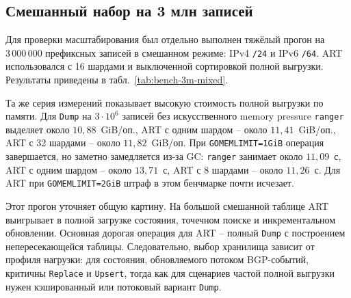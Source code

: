 \subsection{Смешанный набор на 3 млн записей}

Для проверки масштабирования был отдельно выполнен тяжёлый прогон на
$3\,000\,000$ префиксных записей в смешанном режиме: IPv4 \texttt{/24} и
IPv6 \texttt{/64}. ART использовался с 16 шардами и выключенной
сортировкой полной выгрузки. Результаты приведены в
табл.~\ref{tab:bench-3m-mixed}.

\begin{table}[ht]
\centering
\caption{Сравнение \texttt{ranger} и шардированного ART на смешанном наборе из $3\cdot10^6$ записей}
\label{tab:bench-3m-mixed}
\small
{}
\end{table}

Та же серия измерений показывает высокую стоимость полной выгрузки по
памяти. Для \texttt{Dump} на $3\cdot10^6$ записей без искусственного
memory pressure \texttt{ranger} выделяет около $10{,}88$~GiB/оп.,
ART с одним шардом -- около $11{,}41$~GiB/оп., ART с 32 шардами --
около $11{,}82$~GiB/оп. При \texttt{GOMEMLIMIT=1GiB} операция
завершается, но заметно замедляется из-за GC: \texttt{ranger} занимает
около $11{,}09$~с, ART с одним шардом -- около $13{,}71$~с, ART с
8 шардами -- около $11{,}26$~с. Для ART при \texttt{GOMEMLIMIT=2GiB}
штраф в этом бенчмарке почти исчезает.

Этот прогон уточняет общую картину. На большой смешанной таблице ART
выигрывает в полной загрузке состояния, точечном поиске и
инкрементальном обновлении. Основная дорогая операция для ART --
полный \texttt{Dump} с построением непересекающейся таблицы.
Следовательно, выбор хранилища зависит от профиля нагрузки: для
состояния, обновляемого потоком BGP-событий, критичны \texttt{Replace}
и \texttt{Upsert}, тогда как для сценариев частой полной выгрузки нужен
кэшированный или потоковый вариант \texttt{Dump}.

